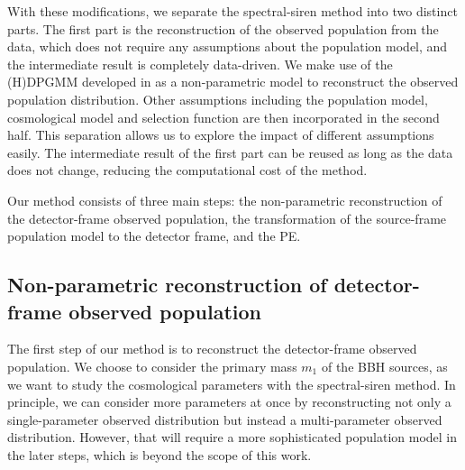 \documentclass[sn-aps, pdflatex]{sn-jnl}
\begin{document}
With these modifications, we separate the spectral-siren method into two distinct parts.
The first part is the reconstruction of the observed population from the data, which does not require any assumptions about the population model, and the intermediate result is completely data-driven.
We make use of the \ac{(H)DPGMM} developed in \cite{Rinaldi:2021bhm} as a non-parametric model to reconstruct the observed population distribution.
Other assumptions including the population model, cosmological model and selection function are then incorporated in the second half.
This separation allows us to explore the impact of different assumptions easily.
The intermediate result of the first part can be reused as long as the data does not change, reducing the computational cost of the method.

Our method consists of three main steps: the non-parametric reconstruction of the detector-frame observed population, the transformation of the source-frame population model to the detector frame, and the \ac{PE}.

\subsection{Non-parametric reconstruction of detector-frame observed population}
\label{sec:reconstruction}

The first step of our method is to reconstruct the detector-frame observed population.
We choose to consider the primary mass $m_1$ of the \ac{BBH} sources, as we want to study the cosmological parameters with the spectral-siren method.
In principle, we can consider more parameters at once by reconstructing not only a single-parameter observed distribution but instead a multi-parameter observed distribution.
However, that will require a more sophisticated population model in the later steps, which is beyond the scope of this work.
\end{document}
